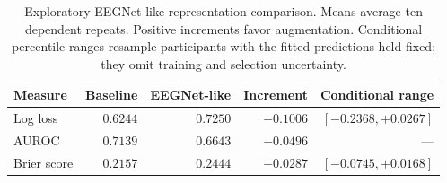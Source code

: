 \begin{table}[htbp]
\centering
\caption{Exploratory EEGNet-like representation comparison. Means average ten dependent repeats. Positive increments favor augmentation. Conditional percentile ranges resample participants with the fitted predictions held fixed; they omit training and selection uncertainty.}
\label{tab:eegnet}
\begin{tabular}{lrrrr}
\toprule
Measure & Baseline & EEGNet-like & Increment & Conditional range\\
\midrule
Log loss & $0.6244$ & $0.7250$ & $-0.1006$ & $[-0.2368, +0.0267]$\\
AUROC & $0.7139$ & $0.6643$ & $-0.0496$ & ---\\
Brier score & $0.2157$ & $0.2444$ & $-0.0287$ & $[-0.0745, +0.0168]$\\
\bottomrule\end{tabular}
\end{table}
